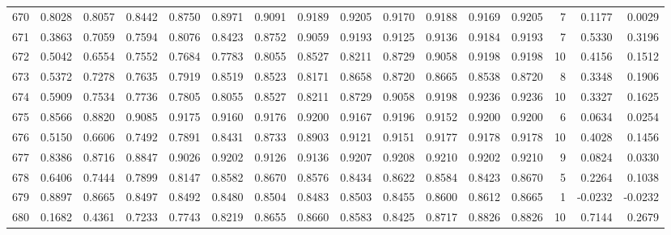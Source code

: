 \begin{tabular}{lrrrrrrrrrrrrrrr}
670 &      0.8028 &  0.8057 &  0.8442 &  0.8750 &  0.8971 &  0.9091 &  0.9189 &  0.9205 &  0.9170 &  0.9188 &   0.9169 &     0.9205 &      7 &                    0.1177 &                     0.0029 \\
671 &      0.3863 &  0.7059 &  0.7594 &  0.8076 &  0.8423 &  0.8752 &  0.9059 &  0.9193 &  0.9125 &  0.9136 &   0.9184 &     0.9193 &      7 &                    0.5330 &                     0.3196 \\
672 &      0.5042 &  0.6554 &  0.7552 &  0.7684 &  0.7783 &  0.8055 &  0.8527 &  0.8211 &  0.8729 &  0.9058 &   0.9198 &     0.9198 &     10 &                    0.4156 &                     0.1512 \\
673 &      0.5372 &  0.7278 &  0.7635 &  0.7919 &  0.8519 &  0.8523 &  0.8171 &  0.8658 &  0.8720 &  0.8665 &   0.8538 &     0.8720 &      8 &                    0.3348 &                     0.1906 \\
674 &      0.5909 &  0.7534 &  0.7736 &  0.7805 &  0.8055 &  0.8527 &  0.8211 &  0.8729 &  0.9058 &  0.9198 &   0.9236 &     0.9236 &     10 &                    0.3327 &                     0.1625 \\
675 &      0.8566 &  0.8820 &  0.9085 &  0.9175 &  0.9160 &  0.9176 &  0.9200 &  0.9167 &  0.9196 &  0.9152 &   0.9200 &     0.9200 &      6 &                    0.0634 &                     0.0254 \\
676 &      0.5150 &  0.6606 &  0.7492 &  0.7891 &  0.8431 &  0.8733 &  0.8903 &  0.9121 &  0.9151 &  0.9177 &   0.9178 &     0.9178 &     10 &                    0.4028 &                     0.1456 \\
677 &      0.8386 &  0.8716 &  0.8847 &  0.9026 &  0.9202 &  0.9126 &  0.9136 &  0.9207 &  0.9208 &  0.9210 &   0.9202 &     0.9210 &      9 &                    0.0824 &                     0.0330 \\
678 &      0.6406 &  0.7444 &  0.7899 &  0.8147 &  0.8582 &  0.8670 &  0.8576 &  0.8434 &  0.8622 &  0.8584 &   0.8423 &     0.8670 &      5 &                    0.2264 &                     0.1038 \\
679 &      0.8897 &  0.8665 &  0.8497 &  0.8492 &  0.8480 &  0.8504 &  0.8483 &  0.8503 &  0.8455 &  0.8600 &   0.8612 &     0.8665 &      1 &                   -0.0232 &                    -0.0232 \\
680 &      0.1682 &  0.4361 &  0.7233 &  0.7743 &  0.8219 &  0.8655 &  0.8660 &  0.8583 &  0.8425 &  0.8717 &   0.8826 &     0.8826 &     10 &                    0.7144 &                     0.2679 \\

\end{tabular}
